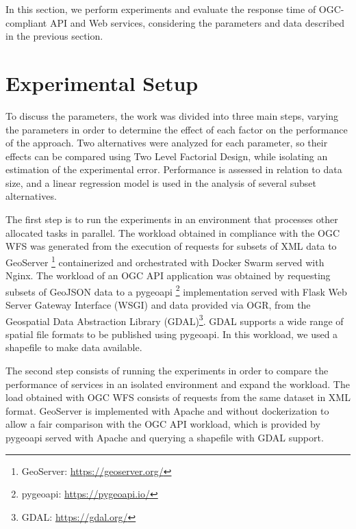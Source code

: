 
In this section, we perform experiments and evaluate the response time of OGC-compliant API and Web services, considering the parameters and data described in the previous section.

\section{Experimental Setup}

To discuss the parameters, the work was divided into three main steps, varying the parameters in order to determine the effect of each factor on the performance of the approach. Two alternatives were analyzed for each parameter, so their effects can be compared using Two Level Factorial Design, while isolating an estimation of the experimental error. Performance is assessed in relation to data size, and a linear regression model is used in the analysis of several subset alternatives.

The first step is to run the experiments in an environment that processes other allocated tasks in parallel. The workload obtained in compliance with the OGC WFS was generated from the execution of requests for subsets of XML data to GeoServer \footnote{GeoServer: \url{https://geoserver.org/}} containerized and orchestrated with Docker Swarm served with Nginx. The workload of an OGC API application was obtained by requesting subsets of GeoJSON data to a pygeoapi \footnote{pygeoapi: \url{https://pygeoapi.io/}} implementation served with Flask Web Server Gateway Interface (WSGI) and data provided via OGR, from the Geospatial Data Abstraction Library (GDAL)\footnote{GDAL: \url{https://gdal.org/}}. GDAL supports a wide range of spatial file formats to be published using pygeoapi. In this workload, we used a shapefile to make data available.

The second step consists of running the experiments in order to compare the performance of services in an isolated environment and expand the workload. The load obtained with OGC WFS consists of requests from the same dataset in XML format. GeoServer is implemented with Apache and without dockerization to allow a fair comparison with the OGC API workload, which is provided by pygeoapi served with Apache and querying a shapefile with GDAL support.%


